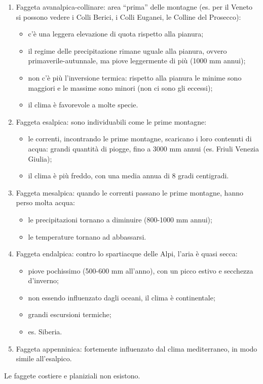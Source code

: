 \begin{enumerate}[nosep]
    \item Faggeta avanalpica-collinare: area ``prima'' delle montagne (es. per il Veneto si possono vedere i Colli Berici, i Colli Euganei, le Colline del Prosecco):
    \begin{itemize}[nosep]
        \item c'è una leggera elevazione di quota rispetto alla pianura;
        \item il regime delle precipitazione rimane uguale alla pianura, ovvero primaverile-autunnale, ma piove leggermente di più (1000 mm annui);
        \item non c'è più l'inversione termica: rispetto alla pianura le minime sono maggiori e le massime sono minori (non ci sono gli eccessi);
        \item il clima è favorevole a molte specie.
    \end{itemize}
    \item Faggeta esalpica: sono individuabili come le prime montagne:
    \begin{itemize}[nosep]
        \item le correnti, incontrando le prime montagne, scaricano i loro contenuti di acqua: grandi quantità di piogge, fino a 3000 mm annui (es. Friuli Venezia Giulia);
        \item il clima è più freddo, con una media annua di 8 gradi centigradi.
    \end{itemize}
    \item Faggeta mesalpica: quando le correnti passano le prime montagne, hanno perso molta acqua:
    \begin{itemize}[nosep]
        \item le precipitazioni tornano a diminuire (800-1000 mm annui);
        \item le temperature tornano ad abbassarsi.
    \end{itemize}
    \item Faggeta endalpica: contro lo spartiacque delle Alpi, l'aria è quasi secca:
    \begin{itemize}[nosep]
        \item piove pochissimo (500-600 mm all'anno), con un picco estivo e secchezza d'inverno;
        \item non essendo influenzato dagli oceani, il clima è continentale;
        \item grandi escursioni termiche;
        \item es. Siberia.
    \end{itemize}
    \item Faggeta appenninica: fortemente influenzato dal clima mediterraneo, in modo simile all'esalpico.
\end{enumerate}
Le faggete costiere e planiziali non esistono.
